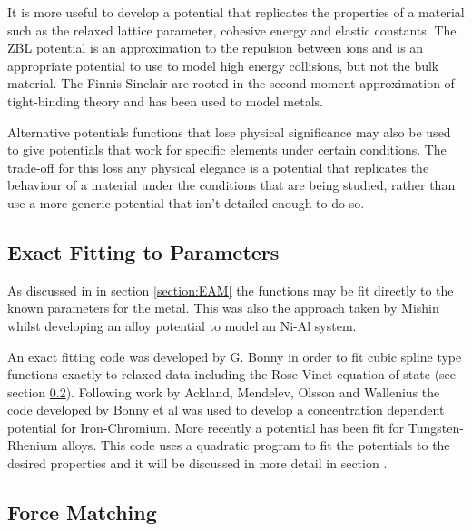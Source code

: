 It is more useful to develop a potential that replicates the properties of a material such as the relaxed lattice parameter, cohesive energy and elastic constants.  The ZBL potential is an approximation to the repulsion between ions and is an appropriate potential to use to model high energy collisions, but not the bulk material.  The Finnis-Sinclair are rooted in the second moment approximation of tight-binding theory and has been used to model metals.

Alternative potentials functions that lose physical significance may also be used to give potentials that work for specific elements under certain conditions.  The trade-off for this loss any physical elegance \cite{twobandackland} is a potential that replicates the behaviour of a material under the conditions that are being studied, rather than use a more generic potential that isn't detailed enough to do so.



\subsection{Exact Fitting to Parameters}

As discussed in in section \ref{section:EAM} the functions may be fit directly to the known parameters for the metal.  This was also the approach taken by Mishin whilst developing an alloy potential to model an Ni-Al system\cite{mishinnial}.

An exact fitting code was developed by G. Bonny in order to fit cubic spline type functions exactly to relaxed data including the Rose-Vinet equation of state (see section \ref{}).  Following work by Ackland\cite{twobandackland}, Mendelev\cite{femendelev}, Olsson and Wallenius\cite{olssonfecr} the code developed by Bonny et al was used to develop a concentration dependent potential for Iron-Chromium\cite{ipbonny}.  More recently a potential has been fit for Tungsten-Rhenium alloys\cite{bonnywre}.  This code uses a quadratic program\cite{nocedalwright1} to fit the potentials to the desired properties and it will be discussed in more detail in section .







\subsection{Force Matching}


